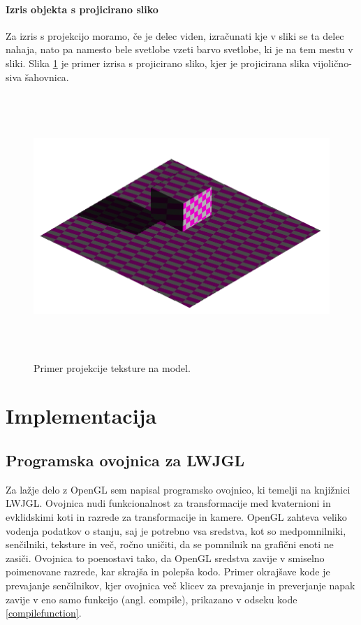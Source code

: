 \documentclass[a4paper, 12pt]{book}
\begin{document}
\subsubsection*{Izris objekta s projicirano sliko}
Za izris s projekcijo moramo, če je delec viden, izračunati kje v sliki se ta delec nahaja, nato pa namesto bele svetlobe vzeti barvo svetlobe, ki je na tem mestu v sliki. Slika \ref{teksturaprojecirananamodel} je primer izrisa s projicirano sliko, kjer je projicirana slika vijolično-siva šahovnica.

\begin{figure}[h]
\begin{center}
\includegraphics[width=\textwidth, height=10cm, keepaspectratio=true]{Tekstura_projecirana_na_model.png}
\end{center}
\caption{Primer projekcije teksture na model.}
\label{teksturaprojecirananamodel}
\end{figure}


\chapter{Implementacija}
\section{Programska ovojnica za LWJGL} \label{ovojnica}

Za lažje delo z OpenGL sem napisal programsko ovojnico, ki temelji na knjižnici LWJGL. Ovojnica nudi funkcionalnost za transformacije med kvaternioni in evklidskimi koti in razrede za transformacije in kamere. OpenGL zahteva veliko vodenja podatkov o stanju, saj je potrebno vsa sredstva, kot so medpomnilniki, senčilniki, teksture in več, ročno uničiti, da se pomnilnik na grafični enoti ne zasiči. Ovojnica to poenostavi tako, da OpenGL sredstva zavije v smiselno poimenovane razrede, kar skrajša in polepša kodo. Primer okrajšave kode je prevajanje senčilnikov, kjer ovojnica več klicev za prevajanje in preverjanje napak zavije v eno samo funkcijo  (angl. compile), prikazano v odseku kode \ref{compilefunction}.
\end{document}
